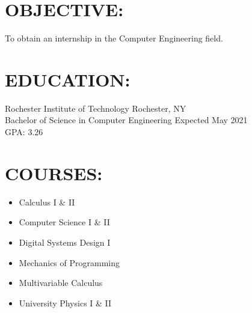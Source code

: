 \documentclass[line,margin]{res}
\begin{document}
\setlength\columnsep{-30pt}
\email{} %
\phone{} %
\address{} %
\address{} %
\website{} %
 
\begin{resume}
 \setlength
 \multicolsep{2pt}

\section{OBJECTIVE:} %
	To obtain an internship in the Computer Engineering field.

\section{EDUCATION:} 
	Rochester Institute of Technology \hfill Rochester, NY \\
	Bachelor of Science in Computer Engineering \hfill Expected May 2021\\ 
	GPA: 3.26

\section{COURSES:}
		\begin{multicols}{2}
		\setlength\columnsep{1pt}
			\begin{itemize}
				\setlength{\itemindent}{-25pt}
				\item[] Calculus I \& II
				\item[] Computer Science I \& II
				\item[] Digital Systems Design I			
				\item[] \hspace{12.5pt} Mechanics of Programming
				\item[] \hspace{12.5pt} Multivariable Calculus
				\item[] \hspace{12.5pt} University Physics I \& II
			\end{itemize}
		\end{multicols}


\end{resume}
\end{document}
